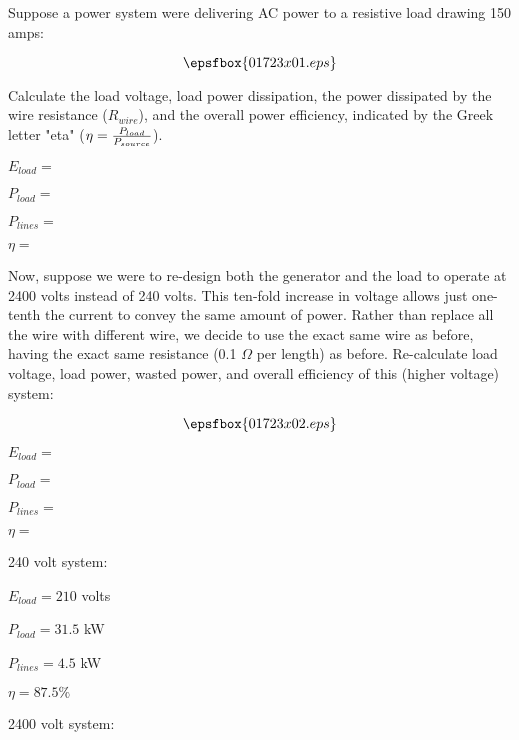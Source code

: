 

Suppose a power system were delivering AC power to a resistive load drawing 150 amps:

$$\epsfbox{01723x01.eps}$$

Calculate the load voltage, load power dissipation, the power dissipated by the wire resistance ($R_{wire}$), and the overall power efficiency, indicated by the Greek letter "eta" ($\eta = {P_{load} \over P_{source}}$).

\medskip
\item {} $E_{load} = $ 
\item {} $P_{load} = $ 
\item {} $P_{lines} = $ 
\item {} $\eta = $ 
\medskip

Now, suppose we were to re-design both the generator and the load to operate at 2400 volts instead of 240 volts.  This ten-fold increase in voltage allows just one-tenth the current to convey the same amount of power.  Rather than replace all the wire with different wire, we decide to use the exact same wire as before, having the exact same resistance (0.1 $\Omega$ per length) as before.  Re-calculate load voltage, load power, wasted power, and overall efficiency of this (higher voltage) system:

$$\epsfbox{01723x02.eps}$$

\medskip
\item {} $E_{load} = $ 
\item {} $P_{load} = $ 
\item {} $P_{lines} = $ 
\item {} $\eta = $ 
\medskip







240 volt system:

\item {} $E_{load} = 210$ volts
\item {} $P_{load} = 31.5$ kW
\item {} $P_{lines} = 4.5$ kW
\item {} $\eta = 87.5 \%$ 
\bigskip

2400 volt system:

